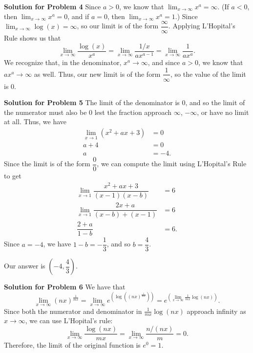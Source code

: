\documentclass{article}
\begin{document}
\vspace{1cm}



\textbf{Solution for Problem 4} Since $a>0$, we know that $\lim_{x\to\infty} x^a=\infty$. (If $a<0$, then $\lim_{x\to\infty} x^a=0$, and if $a=0$, then $\lim_{x\to\infty} x^a=1$.) Since $\lim_{x\to\infty}\log(x)=\infty$, so our limit is of the form $\dfrac{\infty}{\infty}$. Applying L'Hopital's Rule shows us that
$$\lim_{x\to\infty}\dfrac{\log(x)}{x^a}=\lim_{x\to\infty}\dfrac{1/x}{ax^{a-1}}=\lim_{x\to\infty}\dfrac{1}{ax^a}.$$We recognize that, in the denominator, $x^a\to\infty$, and since $a>0$, we know that $ax^a\to\infty$ as well. Thus, our new limit is of the form $\dfrac{1}{\infty}$, so the value of the limit is $\boxed{0}$.\\

\vspace{1cm}



\textbf{Solution for Problem 5} The limit of the denominator is $0$, and so the limit of the numerator must also be $0$ lest the fraction approach $\infty$, $-\infty$, or have no limit at all. Thus, we have
\begin{align*}
	\lim_{x\to 1} (x^2+ax+3) &= 0 \\
	a+4 &= 0 \\
	a &= -4.
\end{align*}
Since the limit is of the form $\dfrac{0}{0}$, we can compute the limit using L'Hopital's Rule to get
\begin{align*}
	\lim_{x\to 1} \dfrac{x^2+ax+3}{(x-1)(x-b)} &= 6 \\
	\lim_{x\to 1} \dfrac{2x+a}{(x-b)+(x-1)} &= 6 \\
	\dfrac{2+a}{1-b} &= 6.
\end{align*}Since $a=-4$, we have $1-b=-\dfrac{1}{3}$, and so $b=\dfrac{4}{3}$.

Our answer is $\boxed{\left(-4,\dfrac{4}{3}\right)}$.\\

\vspace{1cm}



\textbf{Solution for Problem 6} We have that
\[\lim_{x \rightarrow \infty} (nx)^{\frac{1}{mx}} = \lim_{x \rightarrow \infty} e^ {\left( \log \left ( (nx)^{\frac{1}{mx}} \right) \right)} = e^{ \left( \lim_{x \rightarrow \infty}  \frac{1}{mx} \log (nx) \right)}.\]Since both the numerator and denominator in $\frac{1}{mx} \log (nx)$ approach infinity as $x \rightarrow \infty$, we can use L'Hopital's rule:
\[\lim_{x \rightarrow \infty} \frac{\log(nx)}{mx} = \lim_{x \rightarrow \infty} \frac{n/(nx)}{m} = 0.\]
Therefore, the limit of the original function is $e^0 = \boxed{1}$.\\
\end{document}
